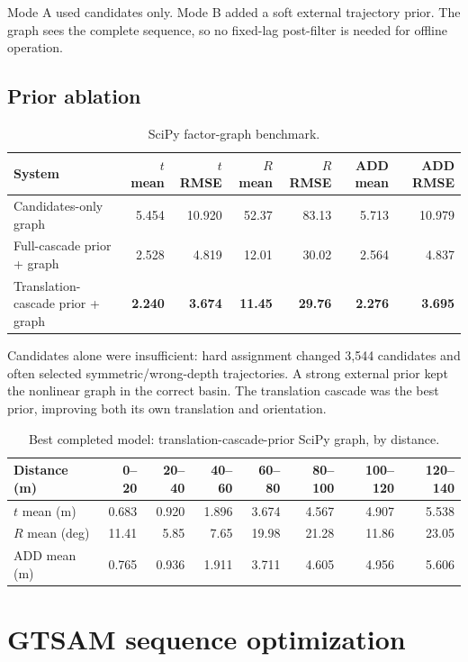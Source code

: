 \documentclass[11pt]{article}
\newcommand{\best}[1]{\textbf{#1}}
\begin{document}
Mode A used candidates only.  Mode B added a soft external trajectory prior.  The graph sees the complete sequence, so no fixed-lag post-filter is needed for offline operation.

\subsection{Prior ablation}

\begin{table}[H]
\centering
\caption{SciPy factor-graph benchmark.}
\begin{tabular}{lrrrrrr}
\toprule
System & $t$ mean & $t$ RMSE & $R$ mean & $R$ RMSE & ADD mean & ADD RMSE\\
\midrule
Candidates-only graph & 5.454 & 10.920 & 52.37 & 83.13 & 5.713 & 10.979\\
Full-cascade prior + graph & 2.528 & 4.819 & 12.01 & 30.02 & 2.564 & 4.837\\
Translation-cascade prior + graph & \best{2.240} & \best{3.674} & \best{11.45} & \best{29.76} & \best{2.276} & \best{3.695}\\
\bottomrule
\end{tabular}
\end{table}

Candidates alone were insufficient: hard assignment changed 3,544 candidates and often selected symmetric/wrong-depth trajectories.  A strong external prior kept the nonlinear graph in the correct basin.  The translation cascade was the best prior, improving both its own translation and orientation.

\begin{table}[H]
\centering
\caption{Best completed model: translation-cascade-prior SciPy graph, by distance.}
\begin{tabular}{lrrrrrrr}
\toprule
Distance (m) & 0--20 & 20--40 & 40--60 & 60--80 & 80--100 & 100--120 & 120--140\\
\midrule
$t$ mean (m) & 0.683 & 0.920 & 1.896 & 3.674 & 4.567 & 4.907 & 5.538\\
$R$ mean (deg) & 11.41 & 5.85 & 7.65 & 19.98 & 21.28 & 11.86 & 23.05\\
ADD mean (m) & 0.765 & 0.936 & 1.911 & 3.711 & 4.605 & 4.956 & 5.606\\
\bottomrule
\end{tabular}
\end{table}

\section{GTSAM sequence optimization}
\end{document}
